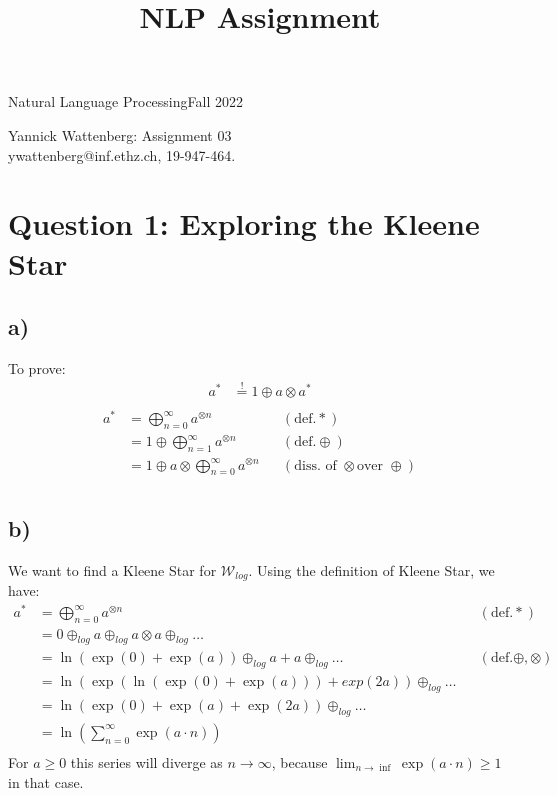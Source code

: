 \documentclass[a4paper,12pt]{ETHexercise}
\title{NLP Assignment}
\begin{document}



{}
{\Large Natural Language Processing}{Fall 2022}
\begin{center}
    {\Huge Yannick Wattenberg: Assignment 03}\\
      \quad\newline
      ywattenberg@inf.ethz.ch, 19-947-464.\\
      \quad\newline
    \timestamp

\end{center}
\section*{Question 1: Exploring the Kleene Star}
\subsection*{a)}
To prove: 
\begin{align*}
    a^* &\stackrel{!}{=} 1 \oplus a \otimes a^* \\
\end{align*}
\begin{align}
    a^* &= \bigoplus^{\infty}_{n=0}a^{\otimes n} &&(\text{def.} *)\\
    &= 1 \oplus \bigoplus^{\infty}_{n=1}a^{\otimes n}  &&(\text{def.} \oplus)\\
    &= 1 \oplus a \otimes \bigoplus^{\infty}_{n=0}a^{\otimes n}  &&(\text{diss. of } \otimes \text{over } \oplus)\\
\end{align}

\subsection*{b)}
We want to find a Kleene Star for $\mathcal{W}_{log}$. Using the definition of Kleene Star, we have:
\begin{align}
    a^* &= \bigoplus^{\infty}_{n=0}a^{\otimes n} &&(\text{def.} *)\\
     &= 0 \oplus_{log} a \oplus_{log} a \otimes a \oplus_{log} \dots\\
     &= \ln(\exp(0) + \exp(a)) \oplus_{log} a + a \oplus_{log} \dots &&(\text{def.} \oplus, \otimes)\\
     &= \ln(\exp(\ln(\exp(0) + \exp(a))) + exp(2a)) \oplus_{log} \dots \\
     &= \ln(\exp(0) + \exp(a)+ \exp(2a)) \oplus_{log} \dots \\
     &= \ln(\sum^\infty_{n=0} \exp(a \cdot n))\\
\end{align}
For $a \geq 0$ this series will diverge as $n \to \infty $, because $\lim_{n \to \inf} \exp(a\cdot n) \geq 1$ in that case.
\end{document}
